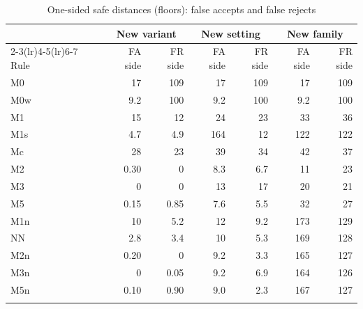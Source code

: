 \documentclass[pdflatex,sn-basic]{sn-jnl}
\newcommand{\tabsize}{\fontsize{8}{9.5}\selectfont}
\begin{document}
\begin{table}[tbp]
\tabsize
\setlength{\tabcolsep}{4.5pt}
\caption{One-sided safe distances (floors): false accepts and false rejects}\label{tab:onesided}
\begin{tabular}{@{}lrrrrrr@{}}
\toprule
 & \multicolumn{2}{c}{New variant} & \multicolumn{2}{c}{New setting} & \multicolumn{2}{c}{New family} \\
\cmidrule(lr){2-3}\cmidrule(lr){4-5}\cmidrule(lr){6-7}
Rule & FA side & FR side & FA side & FR side & FA side & FR side \\
\midrule
M0 & 17 & 109 & 17 & 109 & 17 & 109 \\
M0w & 9.2 & 100 & 9.2 & 100 & 9.2 & 100 \\
M1 & 15 & 12 & 24 & 23 & 33 & 36 \\
M1s & 4.7 & 4.9 & 164 & 12 & 122 & 122 \\
Mc & 28 & 23 & 39 & 34 & 42 & 37 \\
M2 & 0.30 & 0 & 8.3 & 6.7 & 11 & 23 \\
M3 & 0 & 0 & 13 & 17 & 20 & 21 \\
M5 & 0.15 & 0.85 & 7.6 & 5.5 & 32 & 27 \\
M1n & 10 & 5.2 & 12 & 9.2 & 173 & 129 \\
NN & 2.8 & 3.4 & 10 & 5.3 & 169 & 128 \\
M2n & 0.20 & 0 & 9.2 & 3.3 & 165 & 127 \\
M3n & 0 & 0.05 & 9.2 & 6.9 & 164 & 126 \\
M5n & 0.10 & 0.90 & 9.0 & 2.3 & 167 & 127 \\
\botrule
\end{tabular}
\end{table}
\end{document}
